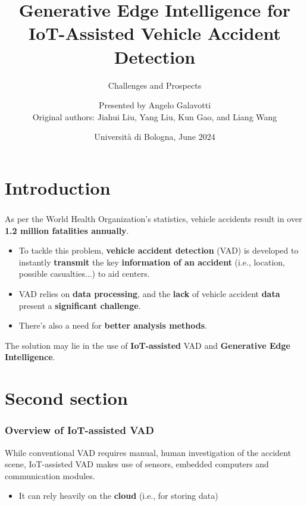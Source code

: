 \documentclass{beamer}
\title[] %
{Generative Edge Intelligence for IoT-Assisted Vehicle Accident Detection}
\subtitle{Challenges and Prospects}
\author[Angelo Galavotti] %
{Presented by Angelo Galavotti \\
    Original authors: Jiahui Liu, Yang Liu, Kun Gao, and Liang Wang}
\date[June 2024] %
{Università di Bologna, June 2024}
\begin{document}
\frame{\titlepage}




\section{Introduction}

\begin{frame}
\frametitle{}
As per the World Health Organization's statistics,
vehicle accidents result in over \textbf{1.2 million fatalities annually}.
\begin{itemize}
  \vspace{0.2cm}
  \item To tackle this problem, \textbf{vehicle accident detection} (VAD) is developed to 
  instantly \textbf{transmit} the key \textbf{information of an accident} (i.e., location, possible casualties...) to aid centers.
  \vspace{0.2cm}
  \item VAD relies on \textbf{data processing}, and the \textbf{lack} of vehicle accident \textbf{data} present a \textbf{significant challenge}.
  \vspace{0.2cm}
  \item There's also a need for \textbf{better analysis methods}.
\end{itemize}
\vspace{0.2cm}

\begin{center}
  The solution may lie in the use of \textbf{IoT-assisted} VAD and \textbf{Generative Edge Intelligence}.
\end{center}

\end{frame}



\section{Second section}

\begin{frame}
\frametitle{Overview of IoT-assisted VAD}
While conventional VAD requires manual, human investigation of the accident scene, IoT-assisted VAD
makes use of sensors, embedded computers and communication modules.

\begin{itemize}
\item It can rely heavily on the \textbf{cloud} (i.e., for storing data)
\end{itemize}
\end{frame}
\end{document}
